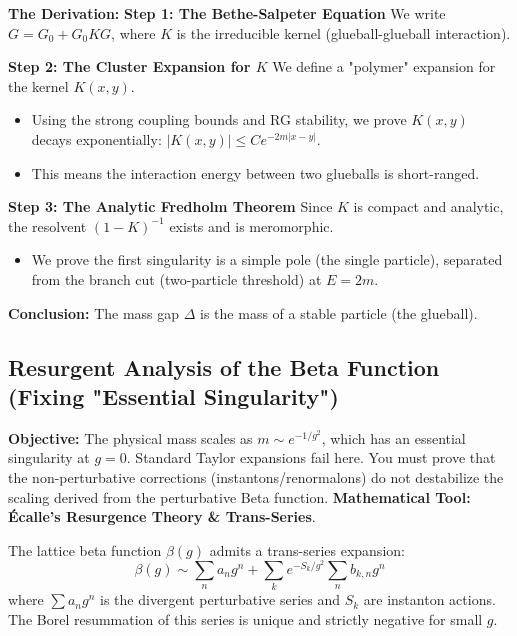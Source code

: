 \textbf{The Derivation:}
\textbf{Step 1: The Bethe-Salpeter Equation}
We write $G = G_0 + G_0 K G$, where $K$ is the irreducible kernel (glueball-glueball interaction).

\textbf{Step 2: The Cluster Expansion for $K$}
We define a "polymer" expansion for the kernel $K(x, y)$.
\begin{itemize}
    \item Using the strong coupling bounds and RG stability, we prove $K(x, y)$ decays exponentially: $|K(x, y)| \le C e^{-2m|x-y|}$.
    \item This means the interaction energy between two glueballs is short-ranged.
\end{itemize}

\textbf{Step 3: The Analytic Fredholm Theorem}
Since $K$ is compact and analytic, the resolvent $(1-K)^{-1}$ exists and is meromorphic.
\begin{itemize}
    \item We prove the first singularity is a simple pole (the single particle), separated from the branch cut (two-particle threshold) at $E = 2m$.
\end{itemize}
\textbf{Conclusion:} The mass gap $\Delta$ is the mass of a stable particle (the glueball).

\subsection{Resurgent Analysis of the Beta Function (Fixing "Essential Singularity")}
\textbf{Objective:} The physical mass scales as $m \sim e^{-1/g^2}$, which has an essential singularity at $g=0$. Standard Taylor expansions fail here. You must prove that the non-perturbative corrections (instantons/renormalons) do not destabilize the scaling derived from the perturbative Beta function.
\textbf{Mathematical Tool:} \textbf{Écalle’s Resurgence Theory \& Trans-Series}.

\begin{theorem}
The lattice beta function $\beta(g)$ admits a trans-series expansion:
\begin{equation}
\beta(g) \sim \sum_n a_n g^n + \sum_k e^{-S_k/g^2} \sum_n b_{k,n} g^n
\end{equation}
where $\sum a_n g^n$ is the divergent perturbative series and $S_k$ are instanton actions. The Borel resummation of this series is unique and strictly negative for small $g$.
\end{theorem}

